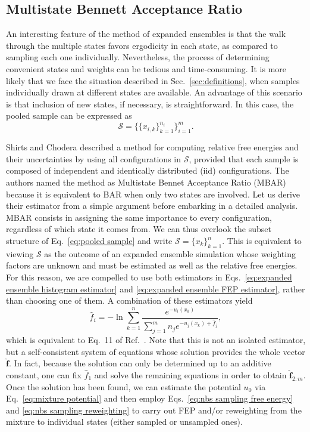 \documentclass[aip,jcp,reprint,amsmath,amssymb]{revtex4-1}
\newcommand{\vt}[1]{\boldsymbol{\mathbf{#1}}}           %
\begin{document}
\subsection{Multistate Bennett Acceptance Ratio}

An interesting feature of the method of expanded ensembles is that the walk through the multiple states favors ergodicity in each state, as compared to sampling each one individually. Nevertheless, the process of determining convenient states and weights can be tedious and time-consuming. It is more likely that we face the situation described in Sec.~\ref{sec:definitions}, when samples individually drawn at different states are available. An advantage of this scenario is that inclusion of new states, if necessary, is straightforward. In this case, the pooled sample can be expressed as
\begin{equation}
\label{eq:pooled sample}
\mathcal S = \Big\{\{x_{i,k}\}_{k=1}^{n_i}\Big\}_{i=1}^m.
\end{equation}

Shirts and Chodera\cite{Shirts_2008} described a method for computing relative free energies and their uncertainties by using all configurations in $\mathcal S$, provided that each sample is composed of independent and identically distributed (iid) configurations. The authors named the method as Multistate Bennet Acceptance Ratio (MBAR) because it is equivalent to BAR when only two states are involved. Let us derive their estimator from a simple argument before embarking in a detailed analysis. MBAR consists in assigning the same importance to every configuration, regardless of which state it comes from. We can thus overlook the subset structure of Eq.~\eqref{eq:pooled sample} and write $\mathcal S = \{x_k\}_{k=1}^n$. This is equivalent to viewing $\mathcal S$ as the outcome of an expanded ensemble simulation whose weighting factors are unknown and must be estimated as well as the relative free energies. For this reason, we are compelled to use both estimators in Eqs.~\eqref{eq:expanded ensemble histogram estimator} and \eqref{eq:expanded ensemble FEP estimator}, rather than choosing one of them. A combination of these estimators yield
\begin{equation}
\label{eq:mbar free energy estimator}
\hat f_i = -\ln \sum_{k=1}^n \frac{e^{-u_i(x_k)}}{\sum_{j=1}^m n_j e^{-u_j(x_k) + \hat f_j}},
\end{equation}
which is equivalent to Eq.~11 of Ref.~. Note that this is not an isolated estimator, but a self-consistent system of equations whose solution provides the whole vector $\hat {\vt f}$. In fact, because the solution can only be determined up to an additive constant, one can fix $\hat f_1$ and solve the remaining equations in order to obtain $\hat{\vt f}_{2:m}$. Once the solution has been found, we can estimate the potential $u_0$ via Eq.~\eqref{eq:mixture potential} and then employ Eqs.~\eqref{eq:nbs sampling free energy} and \eqref{eq:nbs sampling reweighting} to carry out FEP and/or reweighting from the mixture to individual states (either sampled or unsampled ones).\cite{Geyer_1994, Shirts_2017}
\end{document}

